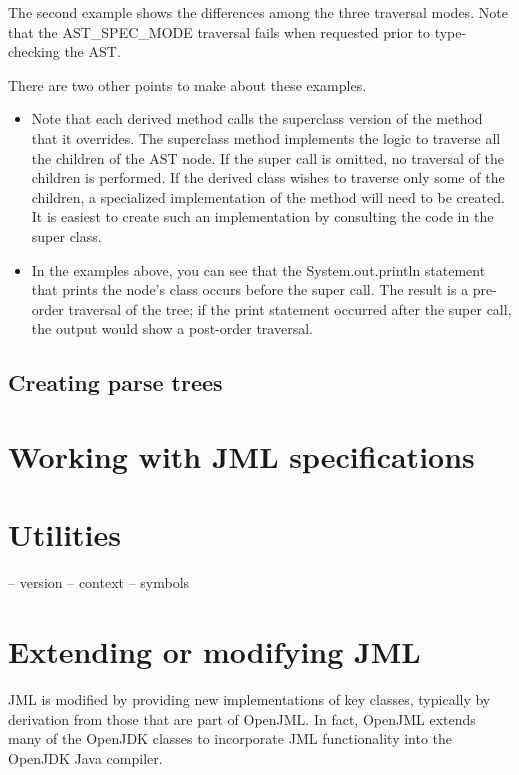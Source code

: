 The second example shows the differences among the three traversal modes. Note that the AST\_SPEC\_MODE traversal fails when requested prior to type-checking the AST.

There are two other points to make about these examples.
\begin{itemize}
\item Note that each derived method calls the superclass version of the method that it overrides. The superclass method implements the logic to traverse all the children of the AST node. If the super call is omitted, no traversal of the children is performed. If the derived class wishes to traverse only some of the children, a specialized implementation of the method will need to be created.
It is easiest to create such an implementation by consulting the code in the super class.
\item In the examples above, you can see that the System.out.println statement that prints the node's class occurs before the super call. The result is a pre-order traversal of the tree; if the print statement occurred after the super call, the output would show a post-order traversal.
\end{itemize}


\subsection{Creating parse trees}

\section{Working with JML specifications}

\section{Utilities}

-- version
-- context
-- symbols

\section{Extending or modifying JML}
JML is modified by providing new implementations of key classes, typically by derivation from those that are part of OpenJML.
In fact, OpenJML extends many of the OpenJDK classes to incorporate JML functionality into the OpenJDK Java compiler.

